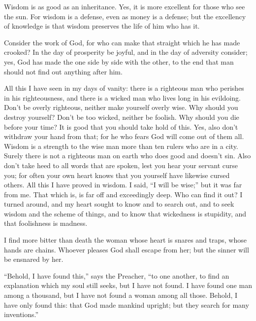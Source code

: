  Wisdom is as good as an inheritance. Yes, it is more
excellent for those who see the sun.  For wisdom is a
defense, even as money is a defense; but the excellency of knowledge is
that wisdom preserves the life of him who has it.

 Consider the work of God, for who can make that straight
which he has made crooked?  In the day of prosperity be
joyful, and in the day of adversity consider; yes, God has made the one
side by side with the other, to the end that man should not find out
anything after him.

 All this I have seen in my days of vanity: there is a
righteous man who perishes in his righteousness, and there is a wicked
man who lives long in his evildoing.  Don't be overly
righteous, neither make yourself overly wise. Why should you destroy
yourself?  Don't be too wicked, neither be foolish. Why
should you die before your time?  It is good that you
should take hold of this. Yes, also don't withdraw your hand from that;
for he who fears God will come out of them all.  Wisdom is
a strength to the wise man more than ten rulers who are in a city.
 Surely there is not a righteous man on earth who does good
and doesn't sin.  Also don't take heed to all words that
are spoken, lest you hear your servant curse you;  for
often your own heart knows that you yourself have likewise cursed
others.  All this I have proved in wisdom. I said, ``I will
be wise;'' but it was far from me.  That which is, is far
off and exceedingly deep. Who can find it out?  I turned
around, and my heart sought to know and to search out, and to seek
wisdom and the scheme of things, and to know that wickedness is
stupidity, and that foolishness is madness.

 I find more bitter than death the woman whose heart is
snares and traps, whose hands are chains. Whoever pleases God shall
escape from her; but the sinner will be ensnared by her.

 ``Behold, I have found this,'' says the Preacher, ``to one
another, to find an explanation  which my soul still seeks,
but I have not found. I have found one man among a thousand, but I have
not found a woman among all those.  Behold, I have only
found this: that God made mankind upright; but they search for many
inventions.''

